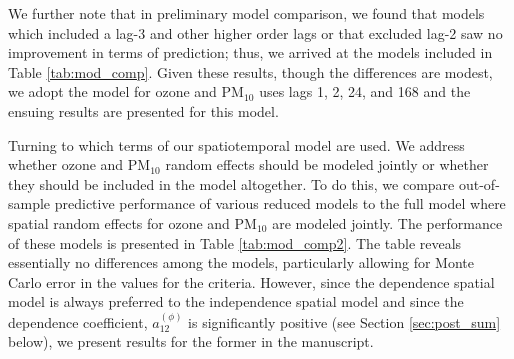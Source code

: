\documentclass[alpha-refs]{wiley-article}
\begin{document}
We further note that in preliminary model comparison, we found that models which included a lag-3 and other higher order lags or that excluded lag-2 saw no improvement in terms of prediction; thus, we arrived at the models included in Table \ref{tab:mod_comp}. Given these results, though the differences are modest, we adopt the model for ozone and $\text{PM}_{10}$ uses lags 1, 2, 24, and 168 and the ensuing results are presented for this model.

Turning to which terms of our spatiotemporal model are used. We address whether ozone and $\text{PM}_{10}$ random effects should be modeled jointly or whether they should be included in the model altogether. To do this, we compare out-of-sample predictive performance of various reduced models to the full model where spatial random effects for ozone and $\text{PM}_{10}$ are modeled jointly. The performance of these models is presented in Table \ref{tab:mod_comp2}. The table reveals essentially no differences among the models, particularly allowing for Monte Carlo error in the values for the criteria. However, since the dependence spatial model is always preferred to the independence spatial model and since the dependence coefficient, $a_{12}^{(\phi)}$ is significantly positive (see Section \ref{sec:post_sum} below), we present results for the former in the manuscript.
\end{document}
